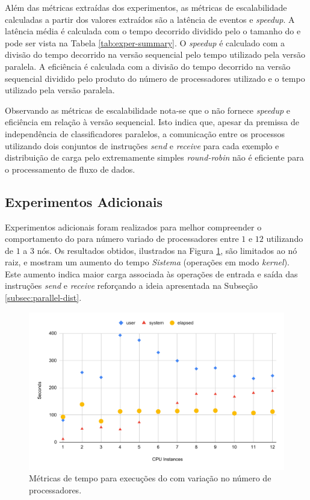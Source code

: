 Além das métricas extraídas dos experimentos, as métricas de escalabilidade
calculadas a partir dos valores extraídos são a latência de eventos e
\emph{speedup}. %
A latência média é calculada com o tempo decorrido dividido pelo o tamanho do
\dataset e pode ser vista na Tabela \ref{tab:exper-summary}.
O \emph{speedup} é calculado com a divisão do tempo decorrido na versão
sequencial %
pelo tempo utilizado pela versão paralela.
A eficiência é calculada com a divisão do tempo decorrido na versão sequencial
dividido pelo produto do número de processadores utilizado e o tempo utilizado
pela versão paralela.

Observando as métricas de escalabilidade nota-se que o \mfog não fornece
\emph{speedup} e eficiência em relação à versão sequencial.
Isto indica que, apesar da premissa de independência de classificadores
paralelos, a comunicação entre os processos utilizando dois conjuntos de
instruções \mpi \emph{send} e \emph{receive} para cada exemplo e distribuição
de carga pelo extremamente simples \emph{round-robin} não é eficiente
para o processamento de fluxo de dados.

\subsection{Experimentos Adicionais}

Experimentos adicionais foram realizados para melhor compreender o comportamento
do \mfog para número variado de processadores entre $1$ e $12$ utilizando de $1$
a $3$ nós.
Os resultados obtidos, ilustrados na Figura \ref{fig:speedup}, são limitados ao
nó raiz, e mostram um aumento do tempo \emph{Sistema} (operações em modo
\emph{kernel}).
Este aumento indica maior carga associada às operações de entrada e saída das
instruções \emph{send} e \emph{receive} reforçando a ideia apresentada na
Subseção \ref{subsec:parallel-dist}.

\begin{figure}[t]
  \centering
  \includegraphics[width=0.65\linewidth,page=1]{experiments/speedup-clean.pdf}
  \caption{Métricas de tempo para execuções do \mfog com variação no número de processadores.}
  \label{fig:speedup}
\end{figure}

